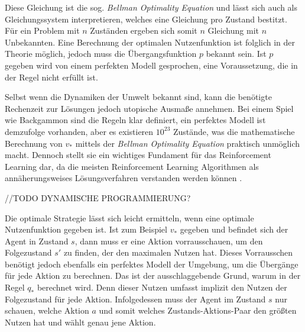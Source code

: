 Diese Gleichung ist die sog. \textit{Bellman Optimality Equation} und lässt sich auch als Gleichungssystem interpretieren, welches eine Gleichung pro Zustand bestitzt. Für ein Problem mit $n$ Zuständen ergeben sich somit $n$ Gleichung mit $n$ Unbekannten. Eine Berechnung der optimalen Nutzenfunktion ist folglich in der Theorie möglich, jedoch muss die Übergangsfunktion $p$ bekannt sein. Ist $p$ gegeben wird von einem perfekten Modell gesprochen, eine Voraussetzung, die in der Regel nicht erfüllt ist.
\par 
Selbst wenn die Dynamiken der Umwelt bekannt sind, kann die benötigte Rechenzeit zur Lösungen jedoch utopische Ausmaße annehmen. Bei einem Spiel wie \glqq Backgammon\grqq{} sind die Regeln klar definiert, ein perfektes Modell ist demzufolge vorhanden, aber es existieren $10^{23}$ Zustände, was die mathematische Berechnung von $v_*$ mittels der \textit{Bellman Optimality Equation} praktisch unmöglich macht. Dennoch stellt sie ein wichtiges Fundament für das Reinforcement Learning dar, da die meisten Reinforcement Learning Algorithmen als annäherungsweises Lösungsverfahren verstanden werden können \cite[S.~66]{Sutton1998}.
\par 
//TODO DYNAMISCHE PROGRAMMIERUNG?
\par 
Die optimale Strategie lässt sich leicht ermitteln, wenn eine optimale Nutzenfunktion gegeben ist. Ist zum Beispiel $v_*$ gegeben und befindet sich der Agent in Zustand $s$, dann muss er eine Aktion vorrausschauen, um den Folgezustand $s'$ zu finden, der den maximalen Nutzen hat. Dieses Vorrausschen benötigt jedoch ebenfalls ein perfektes Modell der Umgebung, um die Übergänge für jede Aktion zu berechnen. Das ist der ausschlaggebende Grund, warum in der Regel $q_*$ berechnet wird. Denn dieser Nutzen umfasst implizit den Nutzen der Folgezustand für jede Aktion. Infolgedessen muss der Agent im Zustand $s$ nur schauen, welche Aktion $a$ und somit welches Zustands-Aktions-Paar den größten Nutzen hat und wählt genau jene Aktion.
\par 